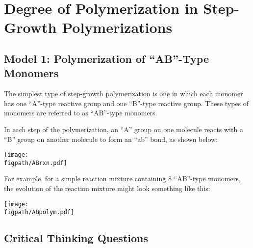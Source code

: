%
%
%
%

\section{Degree of Polymerization in Step-Growth Polymerizations}
\renewcommand{\figpath}{content/polymchem/stepgrowth/Mn-and-stoich/figs}


\subsection{Model 1:  Polymerization of ``AB''-Type Monomers}

The simplest type of step-growth polymerization is one in which each monomer has one ``A''-type reactive group and one ``B''-type reactive group.
These types of monomers are referred to as ``AB''-type monomers.

In each step of the polymerization, an ``A'' group on one molecule reacts with a ``B'' group on another molecule to form an ``ab'' bond, as shown below:

\vspace{0.1in}
\centerline{\texttt{[image: \\figpath/ABrxn.pdf]}}

For example, for a simple reaction mixture containing 8 ``AB''-type monomers, the evolution of the reaction mixture might look something like this:

\vspace{0.1in}
\centerline{\texttt{[image: \\figpath/ABpolym.pdf]}}


\subsection*{Critical Thinking Questions}

